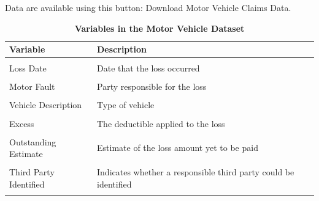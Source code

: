 \documentclass[
  12pt,
  krantz2]{Format/krantzNoCorner}
\begin{document}
Data are available using this button:
Download Motor Vehicle Claims Data.

\begin{table}[!h]
\centering\centering
\caption{\label{tab:DescribeAuto}\textbf{Variables in the Motor Vehicle Dataset}}
\centering
\fontsize{10}{12}\selectfont
\begin{tabular}[t]{>{}l>{\raggedright\arraybackslash}p{12cm}}
\toprule
Variable & Description\\
\midrule
\cellcolor{gray!10}{Policy Term Start Date} & \cellcolor{gray!10}{Start date of the contract year in which the loss occurred}\\
Loss Date & Date that the loss occurred\\
\cellcolor{gray!10}{Reported Date} & \cellcolor{gray!10}{Date that the loss was reported}\\
Motor Fault & Party responsible for the loss\\
\cellcolor{gray!10}{Driver Age} & \cellcolor{gray!10}{Age of the driver}\\
\addlinespace
Vehicle Description & Type of vehicle\\
\cellcolor{gray!10}{Loss Postcode} & \cellcolor{gray!10}{Postal code where the loss occurred}\\
Excess & The deductible applied to the loss\\
\cellcolor{gray!10}{Motor Net Paid} & \cellcolor{gray!10}{Amount paid to the insured (ANU)}\\
Outstanding Estimate & Estimate of the loss amount yet to be paid\\
\addlinespace
\cellcolor{gray!10}{Motor Net Incurred} & \cellcolor{gray!10}{Sum of the amount paid and the estimate of future payments}\\
Third Party Identified & Indicates whether a responsible third party could be identified\\
\cellcolor{gray!10}{Third Party Insured} & \cellcolor{gray!10}{Indicates whether a responsible third party was insured}\\
\bottomrule
\end{tabular}
\end{table}
\end{document}
